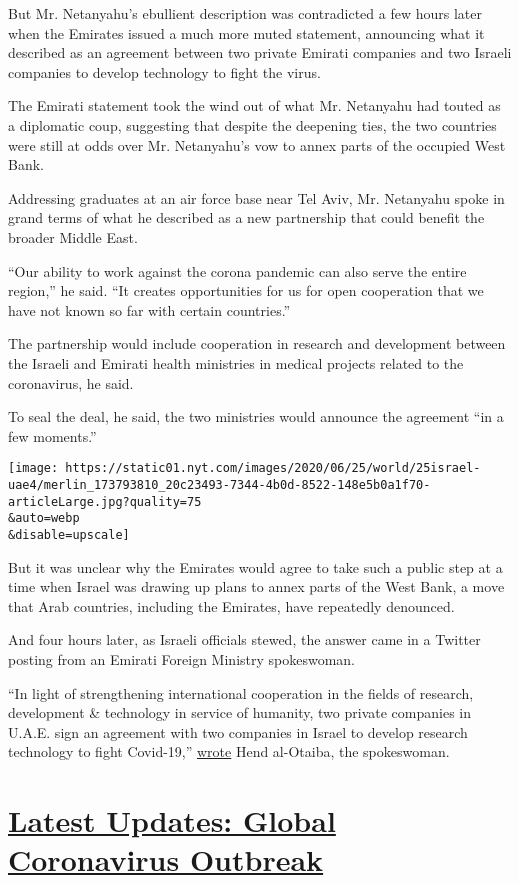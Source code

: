 But Mr. Netanyahu's ebullient description was contradicted a few hours
later when the Emirates issued a much more muted statement, announcing
what it described as an agreement between two private Emirati companies
and two Israeli companies to develop technology to fight the virus.

The Emirati statement took the wind out of what Mr. Netanyahu had touted
as a diplomatic coup, suggesting that despite the deepening ties, the
two countries were still at odds over Mr. Netanyahu's vow to annex parts
of the occupied West Bank.

Addressing graduates at an air force base near Tel Aviv, Mr. Netanyahu
spoke in grand terms of what he described as a new partnership that
could benefit the broader Middle East.

``Our ability to work against the corona pandemic can also serve the
entire region,'' he said. ``It creates opportunities for us for open
cooperation that we have not known so far with certain countries.''

The partnership would include cooperation in research and development
between the Israeli and Emirati health ministries in medical projects
related to the coronavirus, he said.

To seal the deal, he said, the two ministries would announce the
agreement ``in a few moments.''

\texttt{[image: https://static01.nyt.com/images/2020/06/25/world/25israel-uae4/merlin\_173793810\_20c23493-7344-4b0d-8522-148e5b0a1f70-articleLarge.jpg?quality=75\\\&auto=webp\\\&disable=upscale]}

But it was unclear why the Emirates would agree to take such a public
step at a time when Israel was drawing up plans to annex parts of the
West Bank, a move that Arab countries, including the Emirates, have
repeatedly denounced.

And four hours later, as Israeli officials stewed, the answer came in a
Twitter posting from an Emirati Foreign Ministry spokeswoman.

``In light of strengthening international cooperation in the fields of
research, development \& technology in service of humanity, two private
companies in U.A.E. sign an agreement with two companies in Israel to
develop research technology to fight Covid-19,''
\href{https://twitter.com/hend_mana/status/1276231716030513152}{wrote}
Hend al-Otaiba, the spokeswoman.

\hypertarget{latest-updates-global-coronavirus-outbreak}{%
\section{\texorpdfstring{\href{https://www.nytimes.com/2020/08/04/world/coronavirus-covid-19.html?action=click\&pgtype=Article\&state=default\&region=MAIN_CONTENT_1\&context=storylines_live_updates}{Latest
Updates: Global Coronavirus
Outbreak}}{Latest Updates: Global Coronavirus Outbreak}}\label{latest-updates-global-coronavirus-outbreak}}

